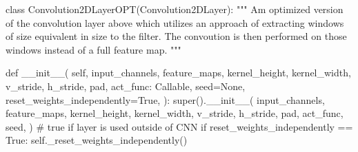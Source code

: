 \documentclass[%
oneside,                 %
final,                   %
10pt]{article}
\begin{document}
\bpycod
class Convolution2DLayerOPT(Convolution2DLayer):
    """
    Am optimized version of the convolution layer above which
    utilizes an approach of extracting windows of size equivalent
    in size to the filter. The convoution is then performed on those
    windows instead of a full feature map.
    """

    def __init__(
        self,
        input_channels,
        feature_maps,
        kernel_height,
        kernel_width,
        v_stride,
        h_stride,
        pad,
        act_func: Callable,
        seed=None,
        reset_weights_independently=True,
    ):
        super().__init__(
            input_channels,
            feature_maps,
            kernel_height,
            kernel_width,
            v_stride,
            h_stride,
            pad,
            act_func,
            seed,
        )
        # true if layer is used outside of CNN
        if reset_weights_independently == True:
            self._reset_weights_independently()
\end{document}
